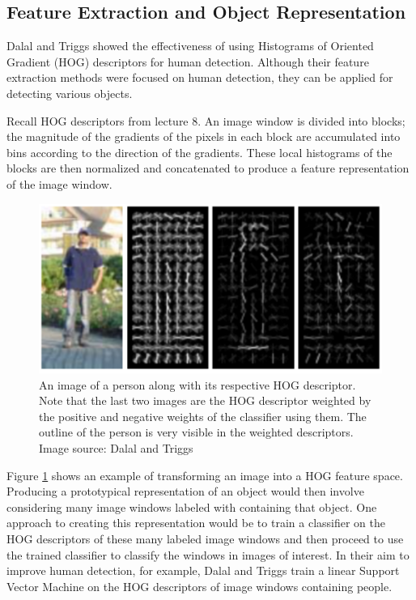 \documentclass{article}
\begin{document}
\subsection{Feature Extraction and Object Representation}
Dalal and Triggs \cite{hog_human_detection} showed the effectiveness of using Histograms of Oriented Gradient (HOG) descriptors for human detection. Although their feature extraction methods were focused on human detection, they can be applied for detecting various objects. 

Recall HOG descriptors from lecture 8. An image window is divided into blocks; the magnitude of the gradients of the pixels in each block are accumulated into bins according to the direction of the gradients. These local histograms of the blocks are then normalized and concatenated to produce a feature representation of the image window.

\begin{figure}[H]
	\includegraphics[width=\linewidth, scale=0.3]{person_template.png}
	\caption{An image of a person along with its respective HOG descriptor. Note that the last two images are the HOG descriptor weighted by the positive and negative weights of the classifier using them. The outline of the person is very visible in the weighted descriptors. Image source: Dalal and Triggs \cite{hog_human_detection}}
    \label{fig:hog_descriptor}
\end{figure}

Figure \ref{fig:hog_descriptor} shows an example of transforming an image into a HOG feature space. Producing a prototypical representation of an object would then involve considering many image windows labeled with containing that object. One approach to creating this representation would be to train a classifier on the HOG descriptors of these many labeled image windows and then proceed to use the trained classifier to classify the windows in images of interest. In their aim to improve human detection, for example, Dalal and Triggs \cite{hog_human_detection} train a linear Support Vector Machine on the HOG descriptors of image windows containing people.
\end{document}
